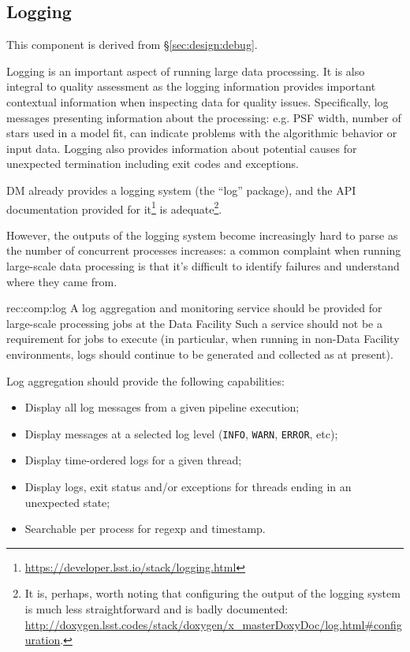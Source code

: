 \subsection{Logging}
\label{sec:comp:log}

This component is derived from \S\ref{sec:design:debug}.

Logging is an important aspect of running large data processing.  It is also
integral to quality assessment as the logging information provides important
contextual information when inspecting data for quality issues.  Specifically,
log messages presenting information about the processing: e.g. PSF width,
number of stars used in a model fit, can indicate problems with the
algorithmic behavior or input data.  Logging also provides information about
potential causes for unexpected termination including exit codes and
exceptions.

DM already provides a logging system (the ``log'' package), and the API
documentation provided for
it\footnote{\url{https://developer.lsst.io/stack/logging.html}} is
adequate\footnote{It is, perhaps, worth noting that configuring the output of the
logging system is much less straightforward and is badly documented:
\url{http://doxygen.lsst.codes/stack/doxygen/x_masterDoxyDoc/log.html\#configuration}.}.

However, the outputs of the logging system become increasingly hard to parse
as the number of concurrent processes increases: a common complaint when
running large-scale data processing is that it's difficult to identify
failures and understand where they came from.

\begin{recommendation}
  {rec:comp:log}
  {A log aggregation and monitoring service should be provided for large-scale processing jobs at the Data Facility}
Such a service should not be a requirement for jobs to execute (in particular,
when running in non-Data Facility environments, logs should continue to be
generated and collected as at present).
\end{recommendation}

Log aggregation should provide the following capabilities:

\begin{itemize}
\item{Display all log messages from a given pipeline execution;}
\item{Display messages at a selected log level (\texttt{INFO}, \texttt{WARN}, \texttt{ERROR}, etc);}
\item{Display time-ordered logs for a given thread;}
\item{Display logs, exit status and/or exceptions for threads ending in an unexpected state;}
\item{Searchable per process for regexp and timestamp.}
\end{itemize}

